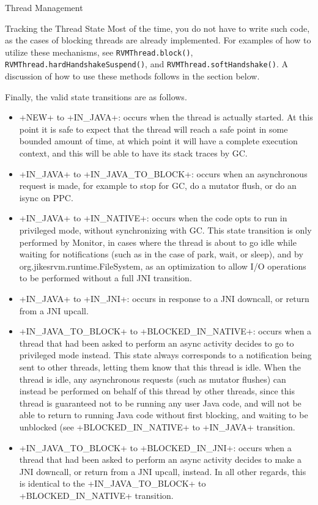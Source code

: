 \begin{section}{Thread Management}
\begin{subsection}{Tracking the Thread State}
Most of the time, you do not have to write such code, as the cases of blocking threads are already implemented. For examples of how to utilize these mechanisms, see \texttt{RVM\-Thread.block()}, \texttt{RVM\-Thread.hard\-Hand\-sha\-ke\-Sus\-pend()}, and \texttt{RVM\-Thread.soft\-Hand\-sha\-ke()}. A discussion of how to use these methods follows in the section below.

Finally, the valid state transitions are as follows.
\begin{itemize}
  \item \spverb+NEW+ to \spverb+IN_JAVA+: occurs when the thread is actually started. At this point it is safe to expect that the thread will reach a safe point in some bounded amount of time, at which point it will have a complete execution context, and this will be able to have its stack traces by GC.
  \item \spverb+IN_JAVA+ to \spverb+IN_JAVA_TO_BLOCK+: occurs when an asynchronous request is made, for example to stop for GC, do a mutator flush, or do an isync on PPC.
  \item \spverb+IN_JAVA+ to \spverb+IN_NATIVE+: occurs when the code opts to run in privileged mode, without synchronizing with GC. This state transition is only performed by Monitor, in cases where the thread is about to go idle while waiting for notifications (such as in the case of park, wait, or sleep), and by org.jikesrvm.runtime.FileSystem, as an optimization to allow I/O operations to be performed without a full JNI transition.
  \item \spverb+IN_JAVA+ to \spverb+IN_JNI+: occurs in response to a JNI downcall, or return from a JNI upcall.
  \item \spverb+IN_JAVA_TO_BLOCK+ to \spverb+BLOCKED_IN_NATIVE+: occurs when a thread that had been asked to perform an async activity decides to go to privileged mode instead. This state always corresponds to a notification being sent to other threads, letting them know that this thread is idle. When the thread is idle, any asynchronous requests (such as mutator flushes) can instead be performed on behalf of this thread by other threads, since this thread is guaranteed not to be running any user Java code, and will not be able to return to running Java code without first blocking, and waiting to be unblocked (see \spverb+BLOCKED_IN_NATIVE+ to \spverb+IN_JAVA+ transition.
  \item \spverb+IN_JAVA_TO_BLOCK+ to \spverb+BLOCKED_IN_JNI+: occurs when a thread that had been asked to perform an async activity decides to make a JNI downcall, or return from a JNI upcall, instead. In all other regards, this is identical to the \spverb+IN_JAVA_TO_BLOCK+ to \spverb+BLOCKED_IN_NATIVE+ transition.

\end{itemize}
\end{subsection}
\end{section}
